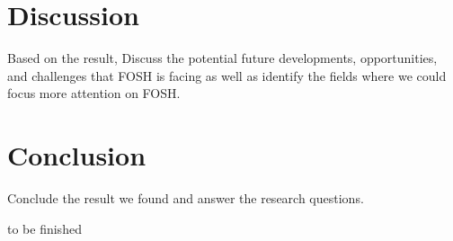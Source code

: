 \documentclass[acmtog]{acmart}
\begin{document}


\section{Discussion}
Based on the result, Discuss the potential future developments, opportunities, and challenges that FOSH is facing as well as identify the fields where we could focus more attention on FOSH.




\section{Conclusion}
Conclude the result we found and answer the research questions.


\begin{acks}
to be finished
\end{acks}





\end{document}
